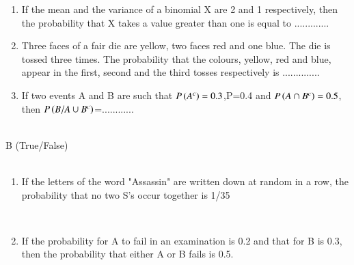 \documentclass[journal,12pt,twocolumn]{IEEEtran}
\theoremstyle{remark}
\begin{document}
\begin{enumerate}
    \item If the mean and the variance of a binomial X are 2 and 1 respectively, then the probability that X takes a value greater than one is equal to .............\hfill{}\\ 
    \item Three faces of a fair die are yellow, two faces red and one blue. The die is tossed three times. The probability that the colours, yellow, red and blue, appear in the first, second and the third tosses  respectively is ..............\hfill{}\\
    \item If two events A and B are such that $P\left(A^{c}\right)=0.3$,P=0.4 and $P\left(A \cap B^{c}\right)=0.5$, then $P\left(B/A \cup B^{c}\right)$=............ \hfill{}\\\\
\end{enumerate}
B (True/False)\\\\
\begin{enumerate}
    \item If the letters of the word "Assassin" are written down at random in a row, the probability that no two S's occur together is 1/35
    
    \hfill{}\\
    \item If the probability for A to fail in an examination is 0.2 and that for B is 0.3, then the probability that either A or B fails is 0.5.
    
    \hfill{}
\end{enumerate}
\end{document}
